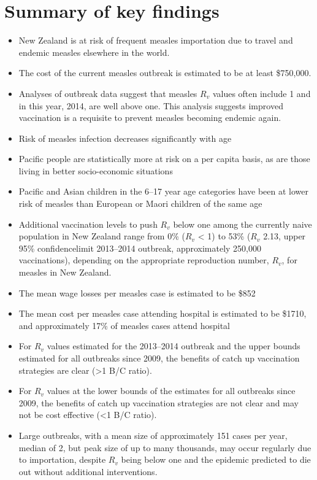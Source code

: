 \documentclass{article}
\begin{document}
\section {Summary of key findings}
\begin{itemize}
\item New Zealand is at risk of frequent measles importation due to travel and endemic measles elsewhere in the world.
\item The cost of the current measles outbreak is estimated to be at least \$750,000.
\item Analyses of outbreak data suggest that measles $R_v$ values often include 1 and in this year, 2014, are well above one. This analysis suggests improved vaccination is a requisite to prevent measles becoming endemic again.
\item Risk of measles infection decreases significantly with age
\item Pacific people are statistically more at risk on a per capita basis, as are those living in better socio-economic situations
\item Pacific and Asian children in the 6--17 year age categories have been at lower risk of measles than European or Maori children of the same age
\item Additional vaccination levels to push $R_v$ below one among the currently naive population in New Zealand range from 0\% ($R_v$ < 1) to 53\% ($R_v$ 2.13, upper 95\% confidencelimit 2013--2014 outbreak, approximately 250,000 vaccinations), depending on the appropriate reproduction number, $R_v$, for measles in New Zealand.
\item The mean wage losses per measles case is estimated to be \$852
\item The mean cost per measles case attending hospital is estimated to be \$1710, and approximately 17\% of measles cases attend hospital
\item For $R_v$ values estimated for the 2013--2014 outbreak and the upper bounds estimated for all outbreaks since 2009, the benefits of catch up vaccination strategies are clear (>1 B/C ratio).
\item For $R_v$ values at the lower bounds of the estimates for all outbreaks since 2009, the benefits of catch up vaccination strategies are not clear and may not be cost effective (<1 B/C ratio).
\item Large outbreaks, with a mean size of approximately 151 cases per year, median of 2, but peak size of up to many thousands, may occur regularly due to importation, despite $R_v$ being below one and the epidemic predicted to die out without additional interventions.
\end{itemize}
\end{document}
